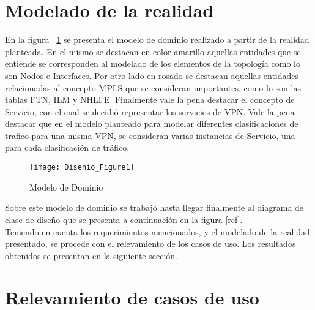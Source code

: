 
\section[Modelado de la realidad]{Modelado de la realidad}

En la figura ~\ref{fig:ModeloDeDominio} se presenta el modelo de dominio realizado a partir de la realidad planteada. En el mismo se destacan en color amarillo aquellas entidades que se entiende se corresponden al modelado de los elementos de la topolog\'ia como lo son Nodos e Interfaces. Por otro lado en rosado se destacan aquellas entidades relacionadas al concepto MPLS que se consideran importantes, como lo son las tablas FTN, ILM y NHLFE. Finalmente vale la pena destacar el concepto de Servicio, con el cual se decidi\'o representar los servicios de VPN. Vale la pena destacar que en el modelo planteado para modelar diferentes clasificaciones de trafico para una misma VPN, se consideran varias instancias de Servicio, una para cada clasificación de tr\'afico. 


\begin{figure}[ht!] 
\centering    
\texttt{[image: Disenio\_Figure1]}
\caption[ModeloDeDominio]{Modelo de Dominio}
\label{fig:ModeloDeDominio}
\end{figure}

Sobre este modelo de dominio se trabaj\'o hasta llegar finalmente al diagrama de clase de dise\~no que se presenta a continuaci\'on en la figura [ref].\\

Teniendo en cuenta los requerimientos mencionados, y el modelado de la realidad presentado, se procede con el relevamiento de los casos de uso. Los resultados obtenidos se presentan en la siguiente secci\'on.

\section[Relevamiento de casos de uso]{Relevamiento de casos de uso}

